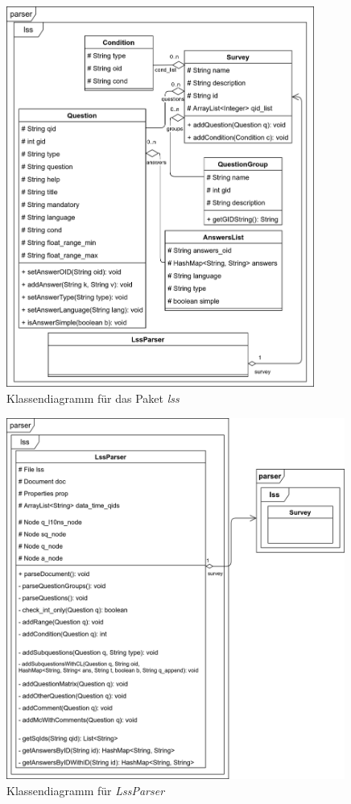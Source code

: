 \begin{figure}[h]
	\label{im:fig:lss}
	\centering
	\includegraphics[width=0.90\textwidth]{./img/cls_lss.png}
	\caption{Klassendiagramm für das Paket \textit{lss}}
\end{figure}

\begin{figure}[t]
	\centering
	\includegraphics[width=0.99\textwidth]{./img/cls_lss_2.png}
	\caption{Klassendiagramm für \textit{LssParser}}
	\label{fig:lss2}
\end{figure}

